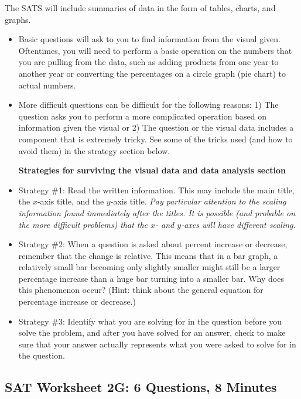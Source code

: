\documentclass[12pt]{book}
\begin{document}
\hrulefill

The SATS will include summaries of data in the form of tables, charts, and graphs.

\begin{itemize}
\item Basic questions will ask to you to find information from the visual given. Oftentimes, you will need to perform a basic operation on the numbers that you are pulling from the data, such as adding products from one year to another year or converting the percentages on a circle graph (pie chart) to actual numbers.
\vfill\item More difficult questions can be difficult for the following reasons: 1) The question asks you to perform a more complicated operation based on information given the visual or 2) The question or the visual data includes a component that is extremely tricky. See some of the tricks used (and how to avoid them) in the strategy section below.

\textbf{Strategies for surviving the visual data and data analysis section}

\item Strategy \#1: Read the written information. This may include the main title, the $x$-axis title, and the $y$-axis title. \textit{Pay particular attention to the scaling information found immediately after the titles. It is possible (and probable on the more difficult problems) that the $x$- and $y$-axes will have different scaling.}

\vfill
\item Strategy \#2: When a question is asked about percent increase or decrease, remember that the change is relative. This means that in a bar graph, a relatively small bar becoming only slightly smaller might still be a larger percentage increase than a huge bar turning into a smaller bar. Why does this phenomenon occur? (Hint: think about the general equation for percentage increase or decrease.) \hrulefill

\vfill
\item Strategy \#3: Identify what you are solving for in the question before you solve the problem, and after you have solved for an answer, check to make sure that your answer actually represents what you were asked to solve for in the question.
\end{itemize}

\vfill
\newpage
\subsection{SAT Worksheet 2G: 6 Questions, 8 Minutes}
\end{document}
